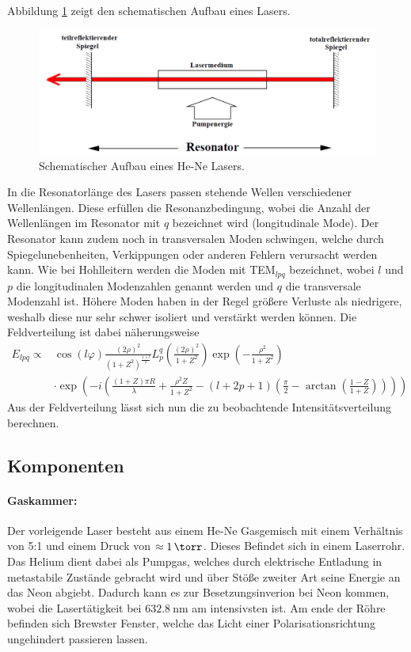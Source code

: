 Abbildung \ref{resonator} zeigt den schematischen Aufbau eines Lasers.
\begin{figure}[h!]
\centering
	\includegraphics[width = 12cm]{img/laser_schem.png}
	\caption{Schematischer Aufbau eines He-Ne Lasers.\cite{V61}}
	\label{resonator}
\end{figure}

In die Resonatorlänge des Lasers passen stehende Wellen verschiedener Wellenlängen.
Diese erfüllen die Resonanzbedingung, wobei die Anzahl der Wellenlängen im Resonator mit $q$ bezeichnet wird (longitudinale Mode).
Der Resonator kann zudem noch in transversalen Moden schwingen, welche durch Spiegelunebenheiten, Verkippungen oder anderen Fehlern verursacht werden kann.
Wie bei Hohlleitern werden die Moden mit TEM$_{lpq}$ bezeichnet, wobei $l$ und $p$ die longitudinalen Modenzahlen genannt werden und $q$ die transversale Modenzahl ist.
Höhere Moden haben in der Regel größere Verluste als niedrigere, weshalb diese nur sehr schwer isoliert und verstärkt werden können.
Die Feldverteilung ist dabei näherungsweise
\begin{align*}
	E_{lpq} \propto &\cos\left({l \varphi}\right) \frac{(2\rho)^2}{(1+Z^2)^\frac{1+l}{2}} L_p^q\left(\frac{(2\rho)^2}{1+Z^2} \right) \exp\left(-\frac{\rho^2}{1+Z^2} \right)& \\
	&\cdot \exp\left(-i\left(\frac{(1+Z)\pi R}{\lambda} + \frac{\rho^2 Z}{1+Z^2}-(l+2p+1) \left(\frac{\pi}{2}-\arctan \left(\frac{1-Z}{1+Z} \right) \right) \right) \right)&
\end{align*}
Aus der Feldverteilung lässt sich nun die zu beobachtende Intensitätsverteilung berechnen.

\subsection{Komponenten} %
\label{sub:komponenten}
\paragraph{Gaskammer:}
Der vorleigende Laser besteht aus einem He-Ne Gasgemisch mit einem Verhältnis von 5:1 und einem Druck von $\approx \SI{1}{\torr}$.
Dieses Befindet sich in einem Laserrohr.
Das Helium dient dabei als Pumpgas, welches durch elektrische Entladung in metastabile Zustände gebracht wird und über Stöße zweiter Art seine Energie an das Neon abgiebt.
Dadurch kann es zur Besetzungsinverion bei Neon kommen, wobei die Lasertätigkeit bei $\SI{632.8}{\nano\meter}$ am intensivsten ist.
Am ende der Röhre befinden sich Brewster Fenster, welche das Licht einer Polarisationsrichtung ungehindert passieren lassen.

